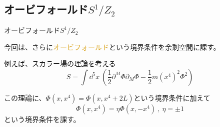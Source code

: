 \documentclass[
  unicode,a4paper,9pt,
  xcolor = {dvipsnames,svgnames},
  hyperref ={colorlinks=true,citecolor=Navy,linkcolor=NavyBlue,urlcolor=purple},
  ja=standard,lualatex
]{beamer}
\begin{document}
\subsection{オービフォールド\texorpdfstring{$S^{1}/Z_{2}$}{S1/Z2}}

\begin{frame}{オービフォールド$S^{1}/Z_{2}$}


  今回は、さらに\textcolor{Goldenrod}{オービフォールド}という境界条件を余剰空間に課す。
  
  \pause
  \vspace*{10pt}

  例えば、スカラー場の理論を考える
  \begin{equation}
    S
    =
    \int\dd^5 x\ 
    \left(  
      \frac{1}{2}\partial^{M}\Phi\partial_{M}\Phi
      -
      \frac{1}{2}m(x^{4})^2\Phi^2
    \right)
    \nonumber
  \end{equation}

  この理論に、$\Phi(x,x^{4})=\Phi(x,x^{4}+2L)$という境界条件に加えて
  \begin{equation}
    \Phi(x,x^{4})
    =
    \eta
    \Phi(x,-x^{4})
    \ ,\ 
    \eta=\pm 1
    \nonumber
  \end{equation}
  という境界条件を課す。  

\end{frame}
\end{document}

